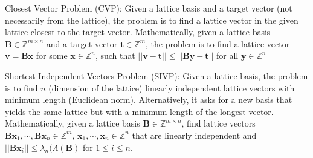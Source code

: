 \begin{comment}
It is to be noted that ISIS problem can be attacked by reducing it to CVP problem.
Considering a lattice $\mathcal{L}'= \Lambda^\perp_q(A^T)=\{ y \in \mathbb{Z}^m : A^Ty \equiv 0 (mod q)\}$, finds any vector (not necessarily short) $w \in Z^m$ such that $A^Tw \equiv v (mod q)$, then solves CVP for $(L', w)$ to find some $y$ close to $w$ and so returns $w-y$ as the ISIS solution.

We sketch the details of solving LWE (in the case of short secrets) by reducing
to ISIS and then solving by CVP.
Given $(A, b)$ we define $A' = (A|I_m)$ to get an ISIS instance $(A',b)$.
Choose any vector $w \in Z^{n+m}$ such that $A'w \equiv b$ (mod $q$).
Then the lattice $L' = \Lambda^{\perp}_q(A') = \{y \in Z^{n+m} : A'y \equiv 0 (\ mod\ q)\}$ is seen to have rank $m'=n+m$ and (assuming the rank of $A'$ is $n$) determinant $q^m = q^{m'-n}$ (the determinant condition can be seen by considering the index of the subgroup $qZ^{n+m}$ in the additive group $L'$).
The condition for success in the algorithm is $\sigma << q^{m/(n+m)}$.
Writing $m' = n+m$ this is $q^{(m'-n)/m'}$, which is the same as the LWE condition above
\end{comment}




\begin{definition}
    Closest Vector Problem (CVP): Given a lattice basis and a target vector (not necessarily from the lattice), the problem is to find a lattice vector in the given lattice closest to the target vector.
    Mathematically, given a lattice basis $\pmb{B}\in \mathbb{Z}^{m \times n}$ and a target vector $\pmb{t} \in \mathbb{Z}^m$, the problem is to find a lattice vector $\pmb{v}=\pmb{Bx}$ for some $\pmb{x} \in \mathbb{Z}^n$, such that $||\pmb{v}-\pmb{t}|| \leq ||\pmb{By}-\pmb{t}||$ for all $\pmb{y} \in \mathbb{Z}^n$
\end{definition}

\begin{definition}
    Shortest Independent Vectors Problem (SIVP): Given a lattice basis, the problem is to find $n$ (dimension of the lattice) linearly independent lattice vectors with minimum length (Euclidean norm).
    Alternatively, it asks for a new basis that yields the same lattice but with a minimum length of the longest vector.
    Mathematically, given a lattice basis $\pmb{B}\in \mathbb{Z}^{m \times n}$, find lattice vectors $\pmb{Bx}_1, \cdots, \pmb{Bx}_n \in \mathbb{Z}^m$, $\pmb{x}_1,\cdots,\pmb{x}_n \in \mathbb{Z}^n$ that are linearly independent and $||\pmb{Bx}_i|| \leq \lambda_n(\Lambda (\pmb{B})$ for $1 \leq i \leq n$.
\end{definition}

